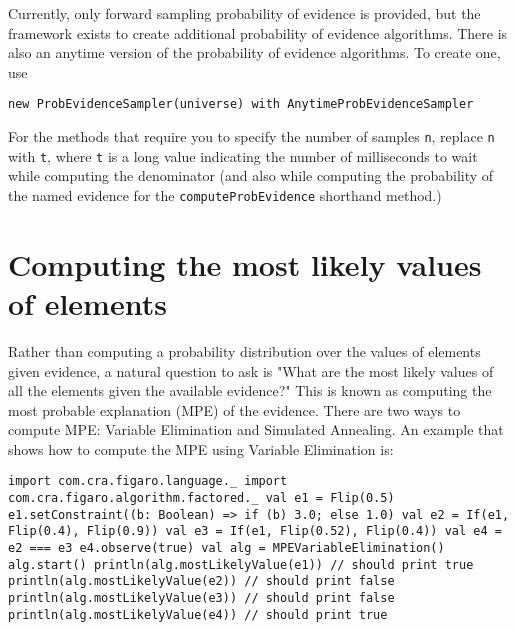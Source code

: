 Currently, only forward sampling probability of evidence is provided, but the framework exists to create additional probability of evidence algorithms. There is also an anytime version of the probability of evidence algorithms. To create one, use

\begin{flushleft}
\texttt{new ProbEvidenceSampler(universe) with AnytimeProbEvidenceSampler}
\end{flushleft}

For the methods that require you to specify the number of samples \texttt{n}, replace \texttt{n} with \texttt{t}, where \texttt{t} is a long value indicating the number of milliseconds to wait while computing the denominator (and also while computing the probability of the named evidence for the \texttt{computeProbEvidence} shorthand method.)

\section{Computing the most likely values of elements}

Rather than computing a probability distribution over the values of elements given evidence, a natural question to ask is "What are the most likely values of all the elements given the available evidence?" This is known as computing the most probable explanation (MPE) of the evidence. There are two ways to compute MPE: Variable Elimination and Simulated Annealing. An example that shows how to compute the MPE using Variable Elimination is:

\begin{flushleft}
\texttt{import com.cra.figaro.language.\_
\newline import com.cra.figaro.algorithm.factored.\_
\newline 
\newline val e1 = Flip(0.5)
\newline e1.setConstraint((b: Boolean) => if (b) 3.0; else 1.0)
\newline val e2 = If(e1, Flip(0.4), Flip(0.9)) 
\newline val e3 = If(e1, Flip(0.52), Flip(0.4)) 
\newline val e4 = e2 === e3
\newline e4.observe(true)
\newline 
\newline val alg = MPEVariableElimination()
\newline alg.start()
\newline println(alg.mostLikelyValue(e1)) // should print true 
\newline println(alg.mostLikelyValue(e2)) // should print false 
\newline println(alg.mostLikelyValue(e3)) // should print false 
\newline println(alg.mostLikelyValue(e4)) // should print true
}
\end{flushleft}

